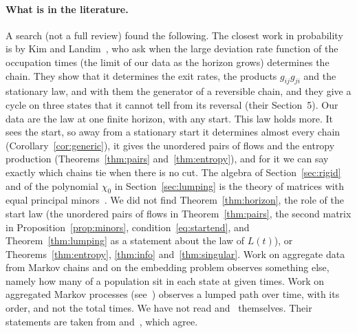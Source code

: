 \documentclass[11pt]{article}
\theoremstyle{definition}
\theoremstyle{remark}
\begin{document}
\paragraph{What is in the literature.} A search (not a full review) found the
following. The closest work in probability is by Kim and
Landim~\cite{kl2024}, who ask when the large deviation rate function of the
occupation times (the limit of our data as the horizon grows) determines the
chain. They show that it determines the exit rates, the products
$g_{ij}g_{ji}$ and the stationary law, and with them the generator of a
reversible chain, and they give a cycle on three states that it cannot tell
from its reversal (their Section~5). Our data are the law at one finite
horizon, with any start. This law holds more. It sees the start, so away from
a stationary start it determines almost every chain
(Corollary~\ref{cor:generic}), it gives the unordered pairs of flows and the
entropy production (Theorems~\ref{thm:pairs} and~\ref{thm:entropy}), and for
it we can say exactly which chains tie when there is no cut. The algebra of Section~\ref{sec:rigid} and of the polynomial $\chi_0$ in Section~\ref{sec:lumping}
is the theory of matrices with equal principal
minors~\cite{hl1984,loewy1986,alahmadieh2026,cggr2025}. We did not find
Theorem~\ref{thm:horizon}, the role of the start law (the unordered pairs of
flows in Theorem~\ref{thm:pairs}, the second matrix in
Proposition~\ref{prop:minors}, condition~\eqref{eq:startend}, and
Theorem~\ref{thm:lumping} as a statement about the law of $L(t)$), or
Theorems~\ref{thm:entropy}, \ref{thm:info} and~\ref{thm:singular}. Work on aggregate data from
Markov chains and on the embedding problem observes something else, namely how
many of a population sit in each state at given times. Work on aggregated
Markov processes (see~\cite{fr1986}) observes a lumped path over time, with
its order, and not the total times. We have not read
\cite{hl1984} and~\cite{loewy1986} themselves. Their statements are taken from
\cite{alahmadieh2026} and~\cite{cggr2025}, which agree.
\end{document}
